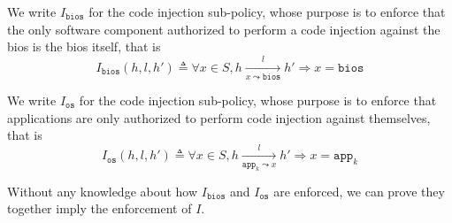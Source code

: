 \begin{definition}
  \label{def:speccert:biospol}

  We write $I_{\mathtt{bios}}$ for the code injection sub-policy, whose purpose
  is to enforce that the only software component authorized to perform a code
  injection against the \ac{bios} is the \ac{bios} itself, that is
  \[
    I_{\mathtt{bios}}(h, l, h') \triangleq \forall x \in S, h \xrightarrow[x
    \leadsto \mathtt{bios}]{l} h' \Rightarrow x = \mathtt{bios}
  \]
\end{definition}

\begin{definition}
  \label{def:speccert:biospol}

  We write $I_{\mathtt{os}}$ for the code injection sub-policy, whose purpose is
  to enforce that applications are only authorized to perform code injection
  against themselves, that is
  \[
    I_\mathtt{os}(h, l, h') \triangleq \forall x \in S, h
    \xrightarrow[\mathtt{app}_k \leadsto x]{l} h' \Rightarrow x = \mathtt{app}_k
  \]
\end{definition}

Without any knowledge about how \( I_{\mathtt{bios}} \) and
\( I_{\mathtt{os}} \) are enforced, we can prove they together imply the
enforcement of \( I \).


